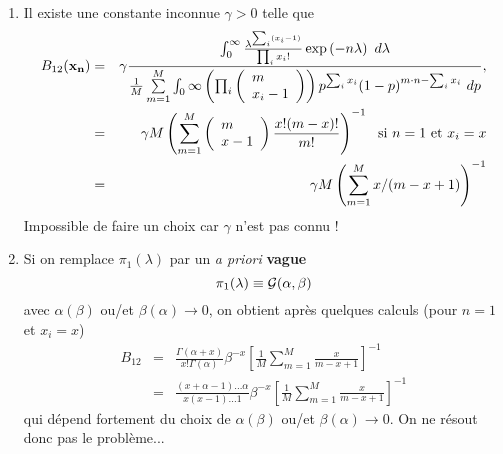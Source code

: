 \begin{rep}
\begin{enumerate}
    \item Il existe une constante inconnue $\gamma >0$ telle que %
\begin{eqnarray*}
B_{12}({\bf x_n}) & = & \gamma \frac{\int_{0}^{\infty} \frac{\lambda^{\sum_{i} (x_i-1)}}{\prod_i x_i !} \exp\left(-n \lambda\right) \ d\lambda}
{\frac{1}{M}\sum\limits_{m=1}^M \int_{0}{\infty} 
\left(\prod_i\left(\begin{array}{l} m \\ x_i-1\end{array}\right) \right) p^{\sum_i x_i} (1-p)^{m\cdot n - \sum_i x_i} \ dp}, \\
& = & \gamma M\left(\sum_{m=1}^M  \left(\begin{array}{l} m \\ x-1\end{array}\right) \frac{x!(m-x)!}{m!}\right)^{-1} \ \ \text{si $n=1$ et $x_i=x$}\\
& = & \gamma M\left(\sum_{m=1}^M  x/(m-x+1)\right)^{-1}
\end{eqnarray*}
Impossible de faire un choix car $\gamma$ n'est pas connu ! 
\item Si on remplace $\pi_1(\lambda)$ par un {\it a priori} {\bf vague}
$$
\pi_1(\lambda)  \equiv  {\cal{G}}(\alpha,\beta)
$$
avec $\alpha(\beta)$ ou/et $\beta(\alpha) \to 0$, 
on obtient après quelques calculs (pour $n=1$ et $x_i=x$)
\begin{eqnarray*}
B_{12} & = & \frac{\Gamma(\alpha+x)}{x!\Gamma(\alpha)} \beta^{-x}\left[\frac{1}{M}\sum\limits_{m=1}^M \frac{x}{m-x+1}\right]^{-1} \\
& = & \frac{(x+\alpha-1)\ldots \alpha}{x(x-1)\ldots 1} \beta^{-x} \left[\frac{1}{M}\sum\limits_{m=1}^M \frac{x}{m-x+1}\right]^{-1}  
\end{eqnarray*}
qui dépend fortement du choix de $\alpha(\beta)$ ou/et $\beta(\alpha) \to 0$. On ne résout donc pas le problème...
\end{enumerate}
\end{rep}